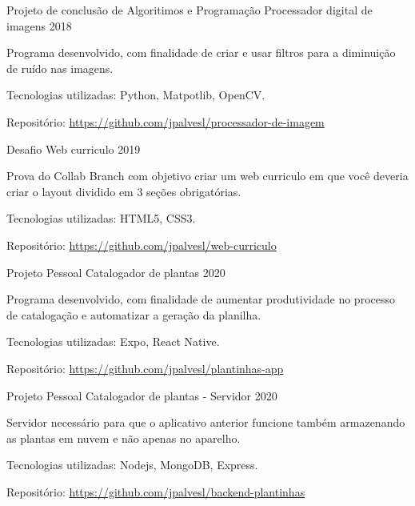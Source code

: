 
\begin{cventries}
  \cventry
    {Projeto de conclusão de Algoritimos e Programação} %
    {Processador digital de imagens} %
    {} %
    {2018} %
    { 
      \begin{cvitems} %
        \item {Programa desenvolvido, com finalidade de criar e usar filtros para a diminuição de ruído nas imagens.}
        \item {Tecnologias utilizadas: Python, Matpotlib, OpenCV.}
        \item {Repositório: \url{https://github.com/jpalvesl/processador-de-imagem}}
      \end{cvitems}
    }
    
  \cventry
    {Desafio} %
    {Web curriculo} %
    {} %
    {2019} %
    {
      \begin{cvitems} %
        \item {Prova do Collab Branch com objetivo criar um web curriculo em que você deveria criar o layout dividido em 3 seções obrigatórias.}
        \item {Tecnologias utilizadas: HTML5, CSS3.}
        \item {Repositório: \url{https://github.com/jpalvesl/web-curriculo}}
      \end{cvitems}
    }

  \cventry
    {Projeto Pessoal} %
    {Catalogador de plantas} %
    {} %
    {2020} %
    { 
      \begin{cvitems} %
        \item {Programa desenvolvido, com finalidade de aumentar produtividade no processo de catalogação e automatizar a geração da planilha.}
        \item {Tecnologias utilizadas: Expo, React Native.}
        \item {Repositório: \url{https://github.com/jpalvesl/plantinhas-app}}
      \end{cvitems}
    }

  \cventry
    {Projeto Pessoal} %
    {Catalogador de plantas - Servidor} %
    {} %
    {2020} %
    { 
      \begin{cvitems} %
        \item {Servidor necessário para que o aplicativo anterior funcione também armazenando as plantas em nuvem e não apenas no aparelho.}
        \item {Tecnologias utilizadas: Nodejs, MongoDB, Express.}
        \item {Repositório: \url{https://github.com/jpalvesl/backend-plantinhas}}
      \end{cvitems}
    }
  
\end{cventries}